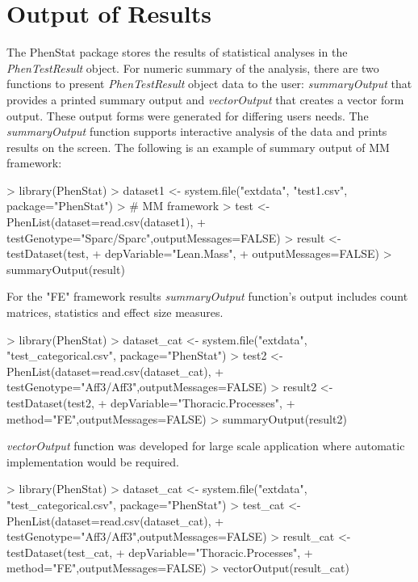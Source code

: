 \documentclass[a4paper]{article}
\begin{document}
\section{Output of Results}
The PhenStat package stores the results of statistical analyses in the \textit{PhenTestResult} object.  
For numeric summary of the analysis, there are two functions to present \textit{PhenTestResult} object data to the user: 
\textit{summaryOutput} that provides a printed summary output and \textit{vectorOutput} that creates a vector form output. 
These output forms were generated for differing users needs. 
\newline\newline
The \textit{summaryOutput} function supports interactive analysis of the data and prints results on the screen.
\newline\newline
The following is an example of summary output of MM framework:
\begin{Schunk}
\begin{Sinput}
> library(PhenStat)
> dataset1 <- system.file("extdata", "test1.csv", package="PhenStat")
> # MM framework
> test <- PhenList(dataset=read.csv(dataset1),
+         testGenotype="Sparc/Sparc",outputMessages=FALSE)
> result <- testDataset(test,
+         depVariable="Lean.Mass",
+         outputMessages=FALSE)
> summaryOutput(result)
\end{Sinput}
\end{Schunk}


For the "FE" framework results \textit{summaryOutput} function's output includes count matrices, statistics and effect size measures.

\begin{Schunk}
\begin{Sinput}
> library(PhenStat)
> dataset_cat <- system.file("extdata", "test_categorical.csv", package="PhenStat")
> test2 <- PhenList(dataset=read.csv(dataset_cat),
+         testGenotype="Aff3/Aff3",outputMessages=FALSE)
> result2 <- testDataset(test2,
+         depVariable="Thoracic.Processes",
+         method="FE",outputMessages=FALSE)  
> summaryOutput(result2)
\end{Sinput}
\end{Schunk}

\textit{vectorOutput} function was developed for large scale application where automatic implementation would be required. 

\begin{Schunk}
\begin{Sinput}
> library(PhenStat)
> dataset_cat <- system.file("extdata", "test_categorical.csv", package="PhenStat")
> test_cat <- PhenList(dataset=read.csv(dataset_cat),
+         testGenotype="Aff3/Aff3",outputMessages=FALSE)
> result_cat <- testDataset(test_cat,
+         depVariable="Thoracic.Processes",
+         method="FE",outputMessages=FALSE)  
> vectorOutput(result_cat)
\end{Sinput}
\end{Schunk}
\end{document}
